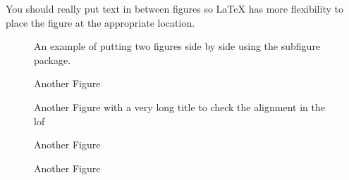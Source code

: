 \documentclass[msc,oneside]{ubcthesis}%
\begin{document}
You should really put text in between figures so LaTeX has more flexibility to place the figure at the appropriate location.

\begin{figure}
	\centering


	\caption{An example of putting two figures side by side using the subfigure package.}
	\label{ref:ex-ppa-l1-linf}
\end{figure}

\begin{figure}%
\caption{Another Figure}%
\end{figure}

\begin{figure}%
\caption{Another Figure with a very long title to check the alignment in the lof}%
\end{figure}

\begin{figure}%
\caption{Another Figure}%
\end{figure}

\begin{figure}%
\caption{Another Figure}%
\end{figure}
\end{document}
